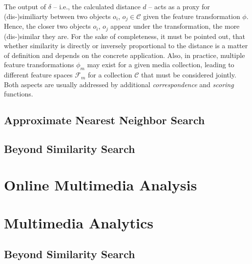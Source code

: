 The output of $\delta$ -- i.e., the calculated distance $d$ -- acts as a proxy for (dis-)similiarty between two objects $o_{i}$, $o_{j} \in \mathcal{C}$ given the feature transformation $\phi$. Hence, the closer two objects $o_{i}$, $o_{j}$ appear under the transformation, the more (dis-)similar they are. For the sake of completeness, it must be pointed out, that whether similarity is directly or inversely proportional to the distance is a matter of definition and depends on the concrete application. Also, in practice, multiple feature transformations $\phi_m$ may exist for a given media collection, leading to different feature spaces $\mathcal{F}_m$ for a collection $\mathcal{C}$ that must be considered jointly. Both aspects are usually addressed by additional \emph{correspondence} and \emph{scoring} functions.


\subsection{Approximate Nearest Neighbor Search}


\subsection{Beyond Similarity Search}

\section{Online Multimedia Analysis}

\section{Multimedia Analytics}

\subsection{Beyond Similarity Search}

